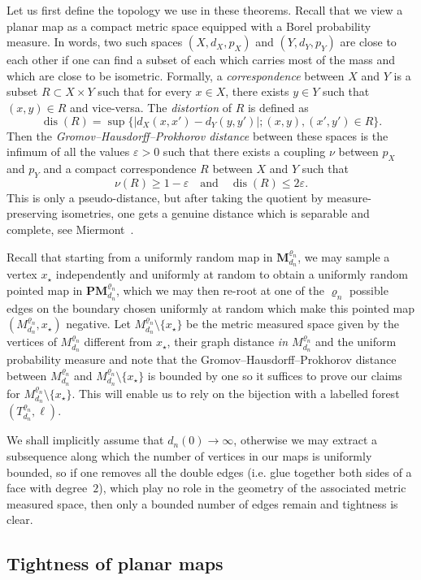 \documentclass[AHL,Unicode,longabstracts,published]{cedram}
\newcommand{\1}{\ensembles{1}}
\newcommand{\Map}{\mathbf{M}}
\newcommand{\PMap}{\mathbf{PM}}
\renewcommand{\le}{\leqslant}
\renewcommand{\ge}{\geqslant}
\DeclareMathOperator{\dis}{dis}
\newcommand{\PMn}{\PMap_{d_n}^{\varrho_n}}
\newcommand{\Mn}{\Map_{d_n}^{\varrho_n}}
\newcommand{\mn}{M_{d_n}^{\varrho_n}}
\newcommand{\fn}{T_{d_n}^{\varrho_n}}
\begin{document}
Let us first define the topology we use in these theorems. Recall that we view a planar map as a compact metric space equipped with a Borel probability measure. In words, two such spaces $(X, d_X, p_X)$ and $(Y, d_Y, p_Y)$ are close to each other if one can find a subset of each which carries most of the mass and which are close to be isometric. Formally, a \emph{correspondence} between $X$ and $Y$ is a subset $R \subset X \times Y$ such that for every $x \in X$, there exists $y \in Y$ such that $(x,y) \in R$ and vice-versa. The \emph{distortion} of $R$ is defined as
\[
\dis(R) = \sup\big\{\left|d_X(x,x') - d_Y(y,y')\right| ; (x,y), (x', y') \in R\big\}.
\]
Then the \emph{Gromov--Hausdorff--Prokhorov distance} between these spaces is the infimum of all the values $\varepsilon > 0$ such that there exists a coupling $\nu$ between $p_X$ and $p_Y$ and a compact correspondence $R$ between $X$ and $Y$ such that
\[
\nu(R) \ge 1-\varepsilon \quad\text{and}\quad \dis(R) \le 2 \varepsilon.
\]
This is only a pseudo-distance, but after taking the quotient by measure-preserving isometries, one gets a genuine distance which is separable and complete, see Miermont~\cite[Proposition~6]{Mie09}.

Recall that starting from a uniformly random map in $\Mn$, we may sample a vertex $x_\star$ independently and uniformly at random to obtain a uniformly random pointed map in $\PMn$, which we may then re-root at one of the $\varrho_n$ possible edges on the boundary chosen uniformly at random which make this pointed map $(\mn, x_\star)$ negative. Let $\mn\setminus\{x_\star\}$ be the metric measured space given by the vertices of $\mn$ different from $x_\star$, their graph distance \emph{in $\mn$} and the uniform probability measure and note that the Gromov--Hausdorff--Prokhorov distance between $\mn$ and $\mn\setminus\{x_\star\}$ is bounded by one so it suffices to prove our claims for $\mn\setminus\{x_\star\}$. This will enable us to rely on the bijection with a labelled forest $(\fn, \ell)$.

We shall implicitly assume that $d_{n}(0) \to \infty$, otherwise we may extract a subsequence along which the number of vertices in our maps is uniformly bounded, so if one removes all the double edges (i.e. glue together both sides of a face with degree~$2$), which play no role in the geometry of the associated metric measured space, then only a bounded number of edges remain and tightness is clear.


\subsection{Tightness of planar maps}\label{sec:tension_cartes}
\end{document}
